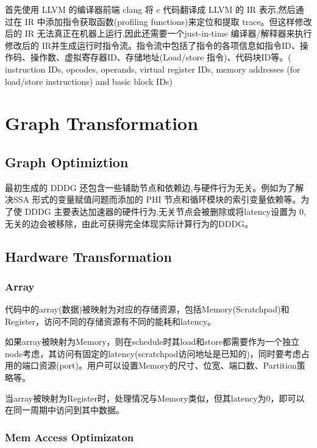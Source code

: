 \documentclass[UTF8]{scrartcl}
\begin{document}
	
	首先使用 LLVM 的编译器前端 clang 将 c 代码翻译成 LLVM 的 IR 表示,然后通过在 IR 中添加指令获取函数(profiling functions)来定位和提取 trace。但这样修改后的 IR 无法真正在机器上运行,因此还需要一个just-in-time 编译器/解释器来执行修改后的 IR并生成运行时指令流。指令流中包括了指令的各项信息如指令ID、操作码、操作数、虚拟寄存器ID、存储地址(Load/store 指令)、代码块ID等。(	instruction IDs, opcodes, operands, virtual register IDs, memory addresses (for load/store instructions) and basic block IDs)

\section{Graph Transformation}

	\subsection{Graph Optimiztion}
	
		最初生成的 DDDG 还包含一些辅助节点和依赖边,与硬件行为无关。例如为了解决SSA 形式的变量赋值问题而添加的 PHI 节点和循环模块的索引变量依赖等。为了使	DDDG 主要表达加速器的硬件行为,无关节点会被删除或将latency设置为 0,无关的边会被移除，由此可获得完全体现实际计算行为的DDDG。
			
	\subsection{Hardware Transformation}
		
		
		
		\subsubsection{Array}
		
			代码中的array(数据)被映射为对应的存储资源，包括Memory(Scratchpad)和Register，访问不同的存储资源有不同的能耗和latency。
			
			如果array被映射为Memory，则在schedule时其load和store都需要作为一个独立node考虑，其访问有固定的latency(scratchpad访问地址是已知的)，同时要考虑占用的端口资源(port)。用户可以设置Memory的尺寸、位宽、端口数、Partition策略等。
			
			当array被映射为Register时，处理情况与Memory类似，但其latency为0，即可以在同一周期中访问到其中数据。
		
		
		\subsubsection{Mem Access Optimizaton}
			
\end{document}
